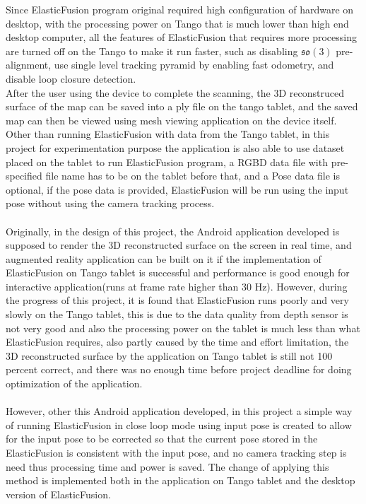 \documentclass[12pt,twoside]{article}
\begin{document}
Since ElasticFusion program original required high configuration of hardware on desktop, with the processing power on Tango that is much lower than high end desktop computer, all the features of ElasticFusion that requires more processing are turned off on the Tango to make it run faster, such as disabling $\mathfrak{so}(3)$ pre-alignment, use single level tracking pyramid by enabling fast odometry, and disable loop closure detection.\\
After the user using the device to complete the scanning, the 3D reconstruced surface of the map can be saved into a ply file on the tango tablet, and the saved map can then be viewed using mesh viewing application on the device itself.\\
Other than running ElasticFusion with data from the Tango tablet, in this project for experimentation purpose the application is also able to use dataset placed on the tablet to run ElasticFusion program, a RGBD data file with pre-specified file name has to be on the tablet before that, and a Pose data file is optional, if the pose data is provided, ElasticFusion will be run using the input pose without using the camera tracking process.\\
\\
Originally, in the design of this project, the Android application developed is supposed to render the 3D reconstructed surface on the screen in real time, and augmented reality application can be built on it if the implementation of ElasticFusion on Tango tablet is successful and performance is good enough for interactive application(runs at frame rate higher than 30 Hz). However, during the progress of this project, it is found that ElasticFusion runs poorly and very slowly on the Tango tablet, this is due to the data quality from depth sensor  
is not very good and also the processing power on the tablet is much less than what ElasticFusion requires, also partly caused by the time and effort limitation, the 3D reconstructed surface by the application on Tango tablet is still not 100 percent correct, and there was no enough time before project deadline for doing optimization of the application.\\
\\
However, other this Android application developed, in this project a simple way of running ElasticFusion in close loop mode using input pose is created to allow for the input pose to be corrected so that the current pose stored in the ElasticFusion is consistent with the input pose, and no camera tracking step is need thus processing time and power is saved. The change of applying this method is implemented both in the application on Tango tablet and the desktop version of ElasticFusion.\\
\end{document}
